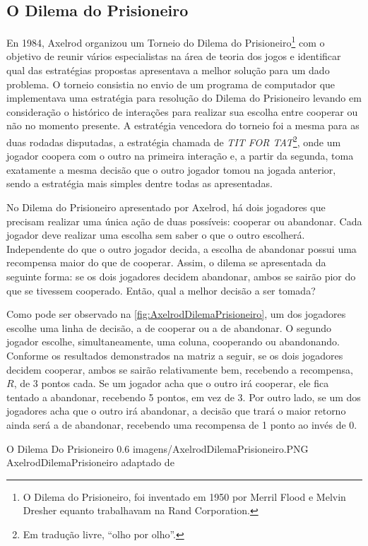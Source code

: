 \subsection{O Dilema do Prisioneiro}

En 1984, Axelrod organizou um Torneio do Dilema do Prisioneiro\footnote{O Dilema do Prisioneiro, foi inventado em 1950  por Merril Flood e Melvin Dresher equanto trabalhavam na Rand Corporation.} com o objetivo de reunir vários especialistas na área de teoria dos jogos e identificar qual das estratégias propostas apresentava a melhor solução para um dado problema. O torneio consistia no envio de um programa de computador que implementava uma estratégia para resolução do Dilema do Prisioneiro levando em consideração o histórico de interações para realizar sua escolha entre cooperar ou não no momento presente. A estratégia vencedora do torneio foi a mesma para as duas rodadas disputadas, a estratégia chamada de \textit{TIT FOR TAT}\footnote{Em tradução livre, \enquote{olho por olho}.}, onde um jogador coopera com o outro na primeira interação e, a partir da segunda, toma exatamente a mesma decisão que o outro jogador tomou na jogada anterior, sendo a estratégia mais simples dentre todas as apresentadas.

No Dilema do Prisioneiro apresentado por Axelrod, há dois jogadores que precisam realizar uma única ação de duas possíveis: cooperar ou abandonar. Cada jogador deve realizar uma escolha sem saber o que o outro escolherá. Independente do que o outro jogador decida, a escolha de abandonar possui uma recompensa maior do que de cooperar. Assim, o dilema se apresentada da seguinte forma: se os dois jogadores decidem abandonar, ambos se sairão pior do que se tivessem cooperado. Então, qual a melhor decisão a ser tomada?

Como pode ser observado na \autoref{fig:AxelrodDilemaPrisioneiro}, um dos jogadores escolhe uma linha de decisão, a de cooperar ou a de abandonar. O segundo jogador escolhe, simultaneamente, uma coluna, cooperando ou abandonando. Conforme os resultados demonstrados na matriz a seguir, se os dois jogadores decidem cooperar, ambos se sairão relativamente bem, recebendo a recompensa, $R$, de 3 pontos cada. Se um jogador acha que o outro irá cooperar, ele fica tentado a abandonar, recebendo 5 pontos, em vez de 3. Por outro lado, se um dos jogadores acha que o outro irá abandonar, a decisão que trará o maior retorno ainda será a de abandonar, recebendo uma recompensa de 1 ponto ao invés de 0.

\figura
	{O Dilema Do Prisioneiro}
	{0.6}
	{imagens/AxelrodDilemaPrisioneiro.PNG}
	{AxelrodDilemaPrisioneiro}
	{adaptado de }

